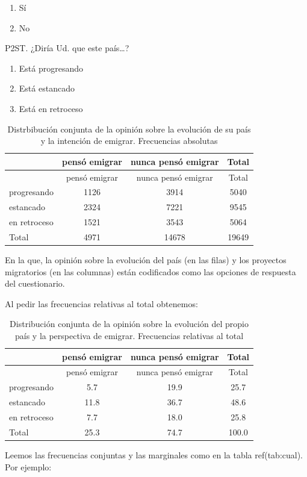 \documentclass[]{book}
\providecommand{\tightlist}{%
  \setlength{\itemsep}{0pt}\setlength{\parskip}{0pt}}
\begin{document}
\begin{enumerate}
\def\labelenumi{\arabic{enumi}.}
\tightlist
\item
  Sí
\item
  No
\end{enumerate}

P2ST. ¿Diría Ud. que este país\ldots{}?

\begin{enumerate}
\def\labelenumi{\arabic{enumi}.}
\tightlist
\item
  Está progresando
\item
  Está estancado
\item
  Está en retroceso
\end{enumerate}

\begin{longtable}[]{@{}lccc@{}}
\caption{\label{tab:abs}Distrbibución conjunta de la opinión sobre la evolución de su país y la intención de emigrar. Frecuencias absolutas}\tabularnewline
\toprule
& pensó emigrar & nunca pensó emigrar & Total\tabularnewline
\midrule
\endfirsthead
\toprule
& pensó emigrar & nunca pensó emigrar & Total\tabularnewline
\midrule
\endhead
progresando & 1126 & 3914 & 5040\tabularnewline
estancado & 2324 & 7221 & 9545\tabularnewline
en retroceso & 1521 & 3543 & 5064\tabularnewline
Total & 4971 & 14678 & 19649\tabularnewline
\bottomrule
\end{longtable}

En la que, la opinión sobre la evolución del país (en las filas) y los proyectos migratorios (en las columnas) están codificados como las opciones de respuesta del cuestionario.

Al pedir las frecuencias relativas al total obtenemos:

\begin{longtable}[]{@{}lccc@{}}
\caption{\label{tab:rel}Distribución conjunta de la opinión sobre la evolución del propio país y la perspectiva de emigrar. Frecuencias relativas al total}\tabularnewline
\toprule
& pensó emigrar & nunca pensó emigrar & Total\tabularnewline
\midrule
\endfirsthead
\toprule
& pensó emigrar & nunca pensó emigrar & Total\tabularnewline
\midrule
\endhead
progresando & 5.7 & 19.9 & 25.7\tabularnewline
estancado & 11.8 & 36.7 & 48.6\tabularnewline
en retroceso & 7.7 & 18.0 & 25.8\tabularnewline
Total & 25.3 & 74.7 & 100.0\tabularnewline
\bottomrule
\end{longtable}

Leemos las frecuencias conjuntas y las marginales como en la tabla ref(tab:cual).
Por ejemplo:
\end{document}

